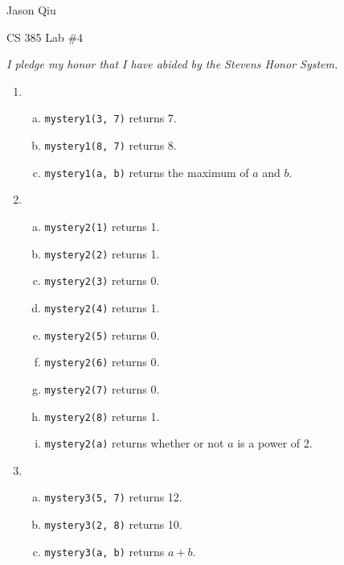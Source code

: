 \documentclass[a4paper,10pt]{article}
\begin{document}
Jason Qiu

CS 385 Lab $\#4$

\emph{I pledge my honor that I have abided by the Stevens Honor System.}

\begin{enumerate}[1.]
\item \begin{enumerate}[(a)]
	\item \verb|mystery1(3, 7)| returns 7.
	\item \verb|mystery1(8, 7)| returns 8.
	\item \verb|mystery1(a, b)| returns the maximum of $a$ and $b$.
\end{enumerate}

\item \begin{enumerate}[(a)]
	\item \verb|mystery2(1)| returns 1.
	\item \verb|mystery2(2)| returns 1.
	\item \verb|mystery2(3)| returns 0.
	\item \verb|mystery2(4)| returns 1.
	\item \verb|mystery2(5)| returns 0.
	\item \verb|mystery2(6)| returns 0.
	\item \verb|mystery2(7)| returns 0.
	\item \verb|mystery2(8)| returns 1.
	\item \verb|mystery2(a)| returns whether or not $a$ is a power of 2.
\end{enumerate}

\item \begin{enumerate}[(a)]
	\item \verb|mystery3(5, 7)| returns 12.
	\item \verb|mystery3(2, 8)| returns 10.
	\item \verb|mystery3(a, b)| returns $a+b$.

\end{enumerate}
\end{enumerate}
\end{document}
